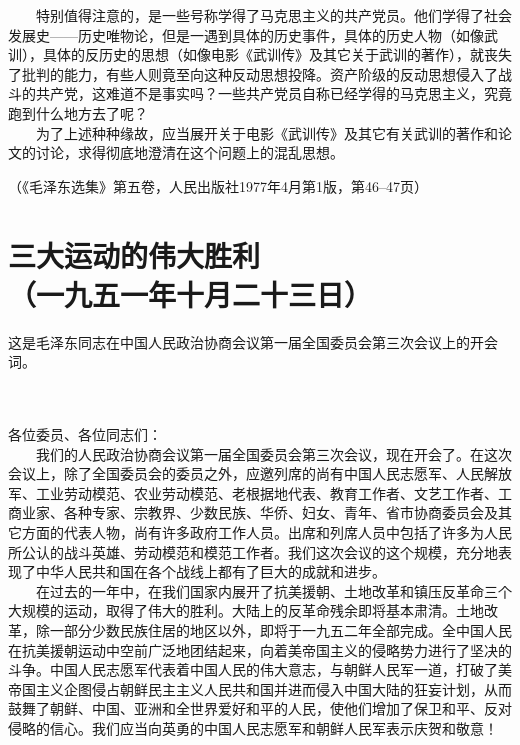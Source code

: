 \documentclass[cn,11pt,chinese]{elegantbook}
\def\myformat#1{\hfil\hfil #1}
\begin{document}
　　特别值得注意的，是一些号称学得了马克思主义的共产党员。他们学得了社会发展史——历史唯物论，但是一遇到具体的历史事件，具体的历史人物（如像武训），具体的反历史的思想（如像电影《武训传》及其它关于武训的著作），就丧失了批判的能力，有些人则竟至向这种反动思想投降。资产阶级的反动思想侵入了战斗的共产党，这难道不是事实吗？一些共产党员自称已经学得的马克思主义，究竟跑到什么地方去了呢？\\
　　为了上述种种缘故，应当展开关于电影《武训传》及其它有关武训的著作和论文的讨论，求得彻底地澄清在这个问题上的混乱思想。\\
\begin{flushright}（《毛泽东选集》第五卷，人民出版社1977年4月第1版，第46--47页）\end{flushright}
\newpage\section*{\myformat{三大运动的伟大胜利}\\\myformat{（一九五一年十月二十三日）}}
\begin{introduction}\item  这是毛泽东同志在中国人民政治协商会议第一届全国委员会第三次会议上的开会词。\end{introduction}\\~\\
各位委员、各位同志们：\\
　　我们的人民政治协商会议第一届全国委员会第三次会议，现在开会了。在这次会议上，除了全国委员会的委员之外，应邀列席的尚有中国人民志愿军、人民解放军、工业劳动模范、农业劳动模范、老根据地代表、教育工作者、文艺工作者、工商业家、各种专家、宗教界、少数民族、华侨、妇女、青年、省市协商委员会及其它方面的代表人物，尚有许多政府工作人员。出席和列席人员中包括了许多为人民所公认的战斗英雄、劳动模范和模范工作者。我们这次会议的这个规模，充分地表现了中华人民共和国在各个战线上都有了巨大的成就和进步。\\
　　在过去的一年中，在我们国家内展开了抗美援朝、土地改革和镇压反革命三个大规模的运动，取得了伟大的胜利。大陆上的反革命残余即将基本肃清。土地改革，除一部分少数民族住居的地区以外，即将于一九五二年全部完成。全中国人民在抗美援朝运动中空前广泛地团结起来，向着美帝国主义的侵略势力进行了坚决的斗争。中国人民志愿军代表着中国人民的伟大意志，与朝鲜人民军一道，打破了美帝国主义企图侵占朝鲜民主主义人民共和国并进而侵入中国大陆的狂妄计划，从而鼓舞了朝鲜、中国、亚洲和全世界爱好和平的人民，使他们增加了保卫和平、反对侵略的信心。我们应当向英勇的中国人民志愿军和朝鲜人民军表示庆贺和敬意！\\
\end{document}
